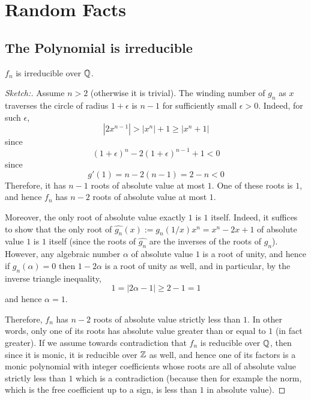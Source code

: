 \documentclass[../main.tex]{subfiles}
\begin{document}
\section{Random Facts}
\subsection{The Polynomial is irreducible}
\begin{lemma}
  $f_n$ is irreducible over $\mathbb{Q}$.
\end{lemma}
\begin{proof}
  [Sketch:]
  Assume $n > 2$ (otherwise it is trivial).
  The winding number of $g_n$ as $x$ traverses the circle of radius $1 + \epsilon$ is $n-1$ for sufficiently small $\epsilon > 0$.
  Indeed, for such $\epsilon$, 
  \[
    |2x^{n-1}| > |x^n| + 1 \geq |x^n + 1|
  \]
  since 
  \[
    \left( 1+\epsilon \right)^n - 2\left( 1+\epsilon \right)^{n-1} + 1 < 0
  \]
  since 
  \[
    g'\left( 1 \right) = n - 2\left( n - 1 \right) = 2 - n < 0
  \]
  Therefore, it has $n-1$ roots of absolute value at most $1$.
  One of these roots is $1$, and hence $f_n$ has $n-2$ roots of absolute value at most $1$.

  Moreover, the only root of absolute value exactly $1$ is $1$ itself.
  Indeed, it suffices to show that the only root of $\hat{g_n}\left( x \right):= g_n\left( 1/ x \right) x^n = x^n - 2x + 1$ of absolute value $1$ is $1$ itself (since the roots of $\hat{g_n}$ are the inverses of the roots of $g_n$).
  However, any algebraic number $\alpha$ of absolute value $1$ is a root of unity, and hence if $g_n\left( \alpha \right) = 0$ then $1 - 2\alpha$ is a root of unity as well, and in particular, by the inverse triangle inequality,
  \[
    1 = |2\alpha - 1| \geq 2 - 1 = 1 
  \]
  and hence $\alpha = 1$.
   
  Therefore, $f_n$ has $n-2$ roots of absolute value strictly less than $1$.
  In other words, only one of its roots has absolute value greater than or equal to $1$ (in fact greater).
  If we assume towards contradiction that $f_n$ is reducible over $\mathbb{Q}$, then since it is monic, it is reducible over $\mathbb{Z}$ as well, and hence one of its factors is a monic polynomial with integer coefficients whose roots are all of absolute value strictly less than $1$ which is a contradiction (because then for example the norm, which is the free coefficient up to a sign, is less than $1$ in absolute value).
\end{proof}
\end{document}
